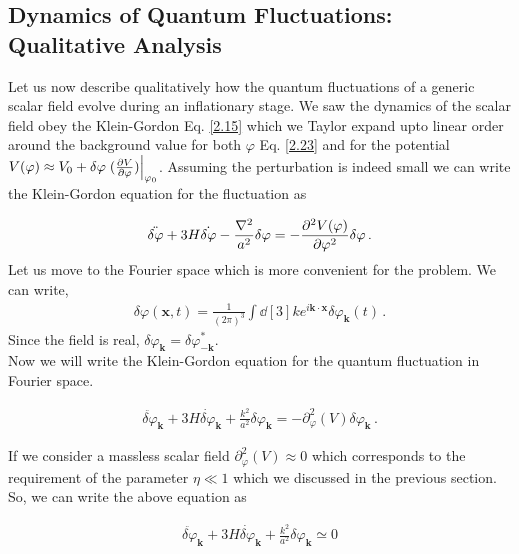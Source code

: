 \subsection{Dynamics of Quantum Fluctuations: Qualitative Analysis}

 \hspace{0.5cm} Let us now describe qualitatively how the quantum fluctuations of a generic scalar field evolve during an inflationary stage. We saw the dynamics of the scalar field obey the Klein-Gordon Eq. \ref{2.15} which we Taylor expand upto linear order around the background value for both $\varphi$ Eq. \ref{2.23} and for the potential \(V(\varphi ) \approx V_0 + \delta \varphi \eval{(\pdv{V}{\varphi })}_{\varphi_0 }\). Assuming the perturbation is indeed small we can write the Klein-Gordon equation for the fluctuation as

\begin{align} 
    \ddot{ \delta \varphi} + 3 H \dot{\delta \varphi} - \frac{\nabla^2}{a^2} \delta \varphi = - \pdv[2]{V(\varphi )}{\varphi } \delta \varphi \,. \label{2.49}
\end{align}
Let us move to the Fourier space which is more convenient for the problem. We can write,
\begin{align}
    \delta \varphi (\mathbf{x}, t) = \frac{1}{(2\pi )^{3}} \int \dd[3]{k} 
    e^{i \mathbf{k} \cdot \mathbf{x}} \delta \varphi _{\mathbf{k}}(t)
    \,.\label{2.50}
\end{align}
Since the field is real, \(\delta \varphi _{\mathbf{k}} = \delta \varphi _{- \mathbf{k}}^{*}\).\\
Now we will write the Klein-Gordon equation  for the quantum fluctuation in Fourier space.

\begin{align}
    \ddot{ \delta \varphi} _{\mathbf{k}} + 3 H \dot{ \delta \varphi}_{\mathbf{k}} + \frac{k^2}{a^2} \delta \varphi _{\mathbf{k}} = - \partial_{\varphi}^2(V) \delta \varphi _{\mathbf{k}}\,.\label{2.51}
\end{align}

If we consider a massless scalar field $\partial_{\varphi}^2(V) \approx 0$ which corresponds to the requirement of the parameter $\eta \ll 1$ which we discussed in the previous section. So, we can write the above equation as

\begin{align}
    \ddot{ \delta \varphi} _{\mathbf{k}} + 3 H \dot{ \delta \varphi}_{\mathbf{k}} + \frac{k^2}{a^2} \delta \varphi _{\mathbf{k}} \simeq 0 \label{2.52}
\end{align}\\

